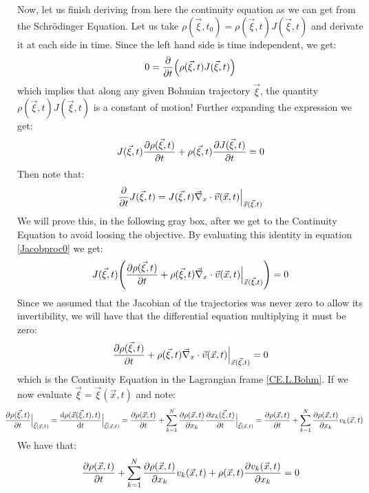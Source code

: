 \documentclass[11pt, a4paper]{article} %
\begin{document}
Now, let us finish deriving from here the continuity equation as we can get from the Schrödinger Equation. Let us take $\rho(\vec{\xi},t_0) = \rho(\vec{\xi},t) J(\vec{\xi},t)$ and derivate it at each side in time. Since the left hand side is time independent, we get:
\begin{equation}
0=\pdv{}{t}\qty( \rho(\vec{\xi},t) J(\vec{\xi},t))
\end{equation}
which implies that along any given Bohmian trajectory $\vec{\xi}$, the quantity $\rho(\vec{\xi},t) J(\vec{\xi},t)$ is a constant of motion! Further expanding the expression we get:
\begin{equation}\label{Jacobproc0}
J(\vec{\xi},t)\pdv{\rho(\vec{\xi},t)}{t}+\rho(\vec{\xi},t)\pdv{J(\vec{\xi},t)}{t}=0
\end{equation}
Then note that:
\begin{equation}\label{jainkoa}
\pdv{}{t}J(\vec{\xi},t)=J(\vec{\xi},t)\vec{\nabla}_x\cdot\vec{v}(\vec{x},t)\Big\rvert_{\vec{x}(\vec{\xi},t)}
\end{equation}
We will prove this, in the following gray box, after we get to the Continuity Equation to avoid loosing the objective. By evaluating this identity in equation \eqref{Jacobproc0} we get:
\begin{equation}
J(\vec{\xi},t)\qty(\pdv{\rho(\vec{\xi},t)}{t}+\rho(\vec{\xi},t)\vec{\nabla}_x\cdot\vec{v}(\vec{x},t)\Big\rvert_{\vec{x}(\vec{\xi},t)})=0
\end{equation}
Since we assumed that the Jacobian of the trajectories was never zero to allow its invertibility, we will have that the differential equation multiplying it must be zero:
\begin{equation}
\pdv{\rho(\vec{\xi},t)}{t}+\rho(\vec{\xi},t)\vec{\nabla}_x\cdot\vec{v}(\vec{x},t)\Big\rvert_{\vec{x}(\vec{\xi},t)}=0
\end{equation}
which is the Continuity Equation in the Lagrangian frame \eqref{CE.L.Bohm}. If we now evaluate $\vec{\xi}=\vec{\xi}(\vec{x},t)$ and note:
\begin{equation}
\hspace*{-0.6cm}\pdv{\rho(\vec{\xi},t)}{t}\Big\rvert_{\vec{\xi}(\vec{x},t)}=\dv{\rho(\vec{x}(\vec{\xi},t),t)}{t}\Big\rvert_{\vec{\xi}(\vec{x},t)}=\pdv{\rho(\vec{x},t)}{t}+\sum_{k=1}^N\pdv{\rho(\vec{x},t)}{x_k}\pdv{x_k(\vec{\xi},t)}{t}\Big\rvert_{\vec{\xi}(\vec{x},t)}=\pdv{\rho(\vec{x},t)}{t}+\sum_{k=1}^N\pdv{\rho(\vec{x},t)}{x_k}v_k(\vec{x},t)
\end{equation}
We have that:
\begin{equation}
\pdv{\rho(\vec{x},t)}{t}+\sum_{k=1}^N\pdv{\rho(\vec{x},t)}{x_k}v_k(\vec{x},t)+\rho(\vec{x},t)\pdv{v_k(\vec{x},t)}{x_k}=0
\end{equation}
\end{document}

